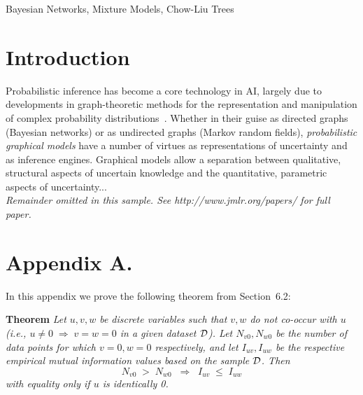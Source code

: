 \documentclass[twoside,11pt]{article}
\newcommand{\dataset}{{\cal D}}
\begin{document}
\begin{keywords}
  Bayesian Networks, Mixture Models, Chow-Liu Trees
\end{keywords}

\section{Introduction}

Probabilistic inference has become a core technology in AI,
largely due to developments in graph-theoretic methods for the 
representation and manipulation of complex probability 
distributions~\citep{pearl:88}.  Whether in their guise as 
directed graphs (Bayesian networks) or as undirected graphs (Markov 
random fields), \emph{probabilistic graphical models} have a number 
of virtues as representations of uncertainty and as inference engines.  
Graphical models allow a separation between qualitative, structural
aspects of uncertain knowledge and the quantitative, parametric aspects 
of uncertainty...\\

{\noindent \em Remainder omitted in this sample. See http://www.jmlr.org/papers/ for full paper.}




\newpage

\appendix
\section*{Appendix A.}
\label{app:theorem}



In this appendix we prove the following theorem from
Section~6.2:

\noindent
{\bf Theorem} {\it Let $u,v,w$ be discrete variables such that $v, w$ do
not co-occur with $u$ (i.e., $u\neq0\;\Rightarrow \;v=w=0$ in a given
dataset $\dataset$). Let $N_{v0},N_{w0}$ be the number of data points for
which $v=0, w=0$ respectively, and let $I_{uv},I_{uw}$ be the
respective empirical mutual information values based on the sample
$\dataset$. Then
\[
	N_{v0} \;>\; N_{w0}\;\;\Rightarrow\;\;I_{uv} \;\leq\;I_{uw}
\]
with equality only if $u$ is identically 0.} \hfill\BlackBox
\end{document}
